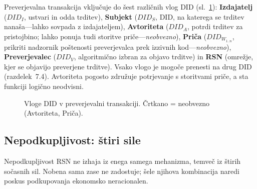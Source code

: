 \documentclass[11pt,a4paper,twocolumn]{article}
\begin{document}
Preverjevalna transakcija vključuje do šest različnih vlog DID (sl.~\ref{fig:roles}): \textbf{Izdajatelj} ($DID_I$, ustvari in odda trditev), \textbf{Subjekt} ($DID_S$, DID, na katerega se trditev nanaša---lahko sovpada z izdajateljem), \textbf{Avtoriteta} ($DID_A$, potrdi trditev za pristojbino; lahko ponuja tudi storitve priče---\emph{neobvezno}), \textbf{Priča} ($DID_{W_{1..n}}$, prikriti nadzornik poštenosti preverjevalca prek izzivnih kod---\emph{neobvezno}), \textbf{Preverjevalec} ($DID_V$, algoritmično izbran za objavo trditve) in \textbf{RSN} (omrežje, kjer se objavijo preverjene trditve). Vsako vlogo je mogoče prenesti na drug DID (razdelek~7.4). Avtoriteta pogosto združuje potrjevanje s storitvami priče, a sta funkciji logično neodvisni.

\begin{figure}[ht]
\centering
{}
\caption{Vloge DID v preverjevalni transakciji. Črtkano = neobvezno (Avtoriteta, Priča).}
\label{fig:roles}
\end{figure}

\subsection{Nepodkupljivost: štiri sile}

Nepodkupljivost RSN ne izhaja iz enega samega mehanizma, temveč iz štirih sočasnih sil. Nobena sama zase ne zadostuje; šele njihova kombinacija naredi poskus podkupovanja ekonomsko neracionalen.
\end{document}
